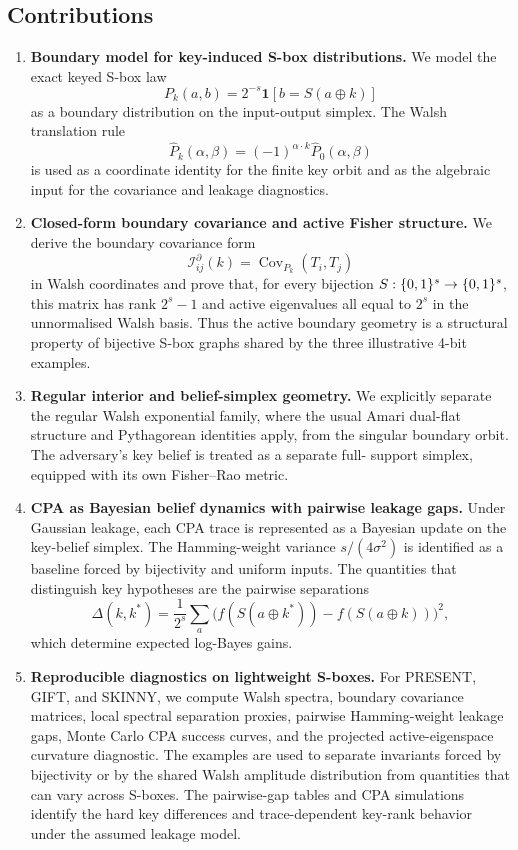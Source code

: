 \subsection{Contributions}\label{subsec:contributions}

\begin{enumerate}[label=\textbf{C\arabic*.}]

\item \textbf{Boundary model for key-induced S-box distributions.}
We model the exact keyed S-box law
\[
  P_k(a,b)=2^{-s}\mathbf 1[b=S(a\oplus k)]
\]
as a boundary distribution on the input-output simplex.  The Walsh translation
rule
\[
  \widehat P_k(\alpha,\beta)
  =(-1)^{\alpha\cdot k}\widehat P_0(\alpha,\beta)
\]
is used as a coordinate identity for the finite key orbit and as the algebraic
input for the covariance and leakage diagnostics.

\item \textbf{Closed-form boundary covariance and active Fisher structure.}
We derive the boundary covariance form
\[
  \mathcal I^{\partial}_{ij}(k)=\operatorname{Cov}_{P_k}(T_i,T_j)
\]
in Walsh coordinates and prove that, for every bijection $S:\{0,1\}^{s}\to\{0,1\}^{s}$,
this matrix has rank $2^s-1$ and active eigenvalues all equal to $2^s$ in the
unnormalised Walsh basis.  Thus the active boundary geometry is a structural
property of bijective S-box graphs shared by the three illustrative 4-bit
examples.

\item \textbf{Regular interior and belief-simplex geometry.}
We explicitly separate the regular Walsh exponential family, where the usual
Amari dual-flat structure and Pythagorean identities apply, from the singular
boundary orbit.  The adversary's key belief is treated as a separate full-
support simplex, equipped with its own Fisher--Rao metric.

\item \textbf{CPA as Bayesian belief dynamics with pairwise leakage gaps.}
Under Gaussian leakage, each CPA trace is represented as a Bayesian update on
the key-belief simplex.  The Hamming-weight variance
$s/(4\sigma^2)$ is identified as a baseline forced by bijectivity and uniform
inputs.  The quantities that distinguish key hypotheses are the pairwise
separations
\[
  \Delta(k,k^*)=\frac1{2^s}\sum_a
  \bigl(f(S(a\oplus k^*))-f(S(a\oplus k))\bigr)^2,
\]
which determine expected log-Bayes gains.

\item \textbf{Reproducible diagnostics on lightweight S-boxes.}
For PRESENT, GIFT, and SKINNY, we compute Walsh spectra, boundary covariance
matrices, local spectral separation proxies, pairwise Hamming-weight leakage
gaps, Monte Carlo CPA success curves, and the projected active-eigenspace
curvature diagnostic.  The examples
are used to separate invariants forced by bijectivity or by the shared Walsh
amplitude distribution from quantities that can vary across S-boxes.  The
pairwise-gap tables and CPA simulations identify the hard key differences and
trace-dependent key-rank behavior under the assumed leakage model.
\end{enumerate}

